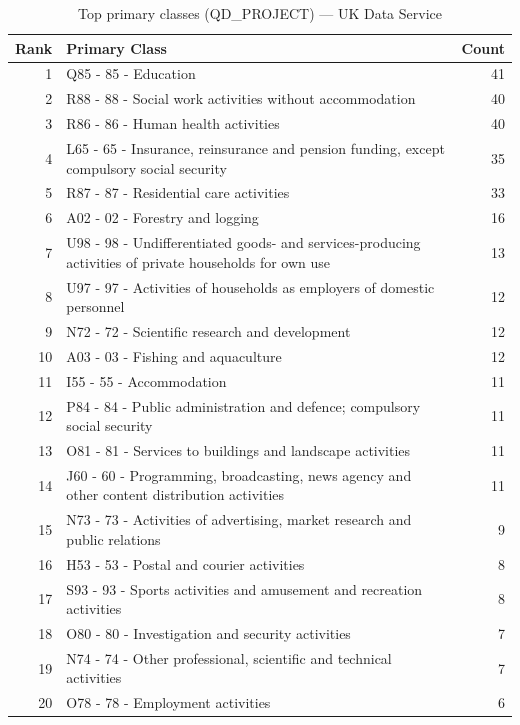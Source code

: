\begin{table}[H]
    \centering
    \begin{tabular}{r p{10cm} r}
    \hline
    \textbf{Rank} & \textbf{Primary Class} & \textbf{Count} \\
    \hline
    1 & Q85 - 85 - Education & 41 \\
    2 & R88 - 88 - Social work activities without accommodation & 40 \\
    3 & R86 - 86 - Human health activities & 40 \\
    4 & L65 - 65 - Insurance, reinsurance and pension funding, except compulsory social security & 35 \\
    5 & R87 - 87 - Residential care activities & 33 \\
    6 & A02 - 02 - Forestry and logging & 16 \\
    7 & U98 - 98 - Undifferentiated goods- and services-producing activities of private households for own use & 13 \\
    8 & U97 - 97 - Activities of households as employers of domestic personnel & 12 \\
    9 & N72 - 72 - Scientific research and development & 12 \\
    10 & A03 - 03 - Fishing and aquaculture & 12 \\
    11 & I55 - 55 - Accommodation & 11 \\
    12 & P84 - 84 - Public administration and defence; compulsory social security & 11 \\
    13 & O81 - 81 - Services to buildings and landscape activities & 11 \\
    14 & J60 - 60 - Programming, broadcasting, news agency and other content distribution activities & 11 \\
    15 & N73 - 73 - Activities of advertising, market research and public relations & 9 \\
    16 & H53 - 53 - Postal and courier activities & 8 \\
    17 & S93 - 93 - Sports activities and amusement and recreation activities & 8 \\
    18 & O80 - 80 - Investigation and security activities & 7 \\
    19 & N74 - 74 - Other professional, scientific and technical activities & 7 \\
    20 & O78 - 78 - Employment activities & 6 \\
    \hline
    \end{tabular}
    \caption{Top primary classes (QD\_PROJECT) --- UK Data Service}
\end{table}

